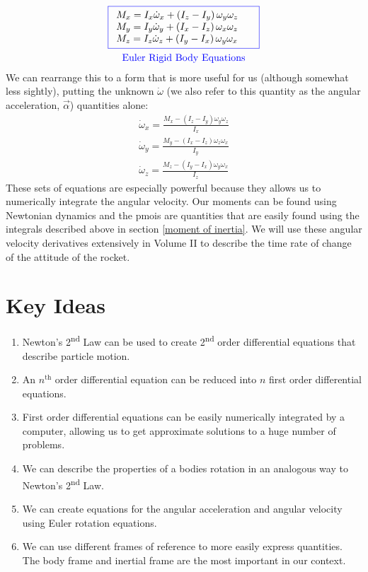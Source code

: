 \documentclass[12pt]{report}
\begin{document}
\begin{gather}\label{eq: moment equations}
\color{blue}\boxed{\color{black}\begin{array}{ll}
     M_x=I_x\dot{\omega}_x+\left(I_z-I_y\right)\omega_y\omega_z
     & \\M_y=I_y\dot{\omega}_y+\left(I_x-I_z\right)\omega_x\omega_z\
     &\\ M_z=I_z\dot{\omega}_z+\left(I_y-I_x\right)\omega_y\omega_x
\end{array}}
\\\mathrm{\color{blue}Euler \ Rigid \ Body \ Equations}
\end{gather}
We can rearrange this to a form that is more useful for us (although somewhat less sightly), putting the unknown $\dot\omega$ (we also refer to this quantity as the angular acceleration, $\vec{\alpha}$) quantities alone:
\begin{gather}\label{eq: moment eq 2}
    \dot{\omega}_x=\frac{M_x-\left(I_z-I_y\right)\omega_y\omega_z}{I_x}\\
    \dot{\omega}_y=\frac{M_y-\left(I_x-I_z\right)\omega_z\omega_x}{I_y}\\
    \dot{\omega}_z=\frac{M_z-\left(I_y-I_x\right)\omega_y\omega_x}{I_z}
\end{gather}
These sets of equations are especially powerful because they allows us to numerically integrate the angular velocity. Our moments can be found using Newtonian dynamics and the \glspl{pmoi} are quantities that are easily found using the integrals described above in section \ref{moment of inertia}. We will use these angular velocity derivatives extensively in Volume II to describe the time rate of change of the attitude of the rocket.

\section{Key Ideas}
\begin{enumerate}
    \item Newton's 2\textsuperscript{nd} Law can be used to create 2\textsuperscript{nd} order differential equations that describe particle motion.
    \item An $n^{\mathrm{th}}$ order differential equation can be reduced into $n$ first order differential equations.
    \item First order differential equations can be easily numerically integrated by a computer, allowing us to get approximate solutions to a huge number of problems.
    \item We can describe the properties of a bodies rotation in an analogous way to Newton's 2\textsuperscript{nd} Law.
    \item We can create equations for the angular acceleration and angular velocity using Euler rotation equations.
    \item We can use different frames of reference to more easily express quantities. The body frame and inertial frame are the most important in our context.
    
\end{enumerate}
\end{document}
